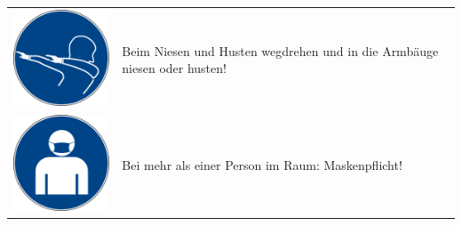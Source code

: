 \documentclass[24pt, a4paper, portrait]{article}
\begin{document}
\begin{tabular}{ m{4.2cm} m{11.5cm} }
    \vspace{2mm}
    \includegraphics[width=4cm]{niesetikette} & Beim Niesen und Husten wegdrehen und in die Armbäuge niesen oder husten! \\
    \vspace{2mm}
    \includegraphics[width=4cm]{maskenpflicht} & Bei mehr als einer Person im Raum: Maskenpflicht! \\
\end{tabular}
\end{document}
